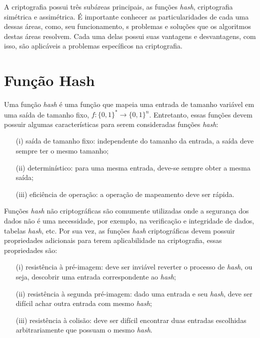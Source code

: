 A criptografia possui três subáreas principais, as funções \textit{hash}, criptografia simétrica e assimétrica. É importante conhecer as particularidades de cada uma dessas áreas, como, seu funcionamento, s problemas e soluções que os algoritmos destas áreas resolvem. Cada uma delas possui suas vantagens e desvantagens, com isso, são aplicáveis a problemas específicos na criptografia.

\section{Função Hash}
    Uma função \textit{hash} é uma função que mapeia uma entrada de tamanho variável em uma saída de tamanho fixo, $f:\{0,1\}^{*} \rightarrow \{0,1\}^n$. Entretanto, essas funções devem possuir algumas características para serem consideradas funções \textit{hash}:

    \begin{enumerate}
        \item[(i)] saída de tamanho fixo: independente do tamanho da entrada, a saída deve sempre ter o mesmo tamanho;
        \item[(ii)] determinístico: para uma mesma entrada, deve-se sempre obter a mesma saída;
        \item[(iii)] eficiência de operação: a operação de mapeamento deve ser rápida.
    \end{enumerate}

    Funções \textit{hash} não criptográficas são comumente utilizadas onde a segurança dos dados não é uma necessidade, por exemplo, na verificação e integridade de dados, tabelas \textit{hash}, etc. Por sua vez, as funções \textit{hash} criptográficas devem possuir propriedades adicionais para terem aplicabilidade na criptografia, essas propriedades são:

    \begin{enumerate}
        \item[(i)] resistência à pré-imagem: deve ser inviável reverter o processo de \textit{hash}, ou seja, descobrir uma entrada correspondente ao \textit{hash};
        \item[(ii)] resistência à segunda pré-imagem: dado uma entrada e seu \textit{hash}, deve ser difícil achar outra entrada com mesmo \textit{hash};
        \item[(iii)] resistência à colisão: deve ser difícil encontrar duas entradas escolhidas arbitrariamente que possuam o mesmo \textit{hash}.
    \end{enumerate}

